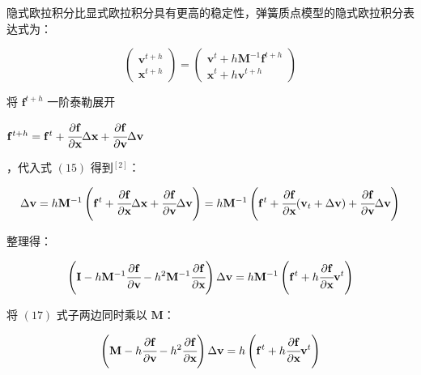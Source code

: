 \documentclass[UTF8]{ctexart}
\begin{document}
隐式欧拉积分比显式欧拉积分具有更高的稳定性，弹簧质点模型的隐式欧拉积分表达式为：

\begin{large}
\begin{equation}
\begin{pmatrix}
\mathbf{v}^{t+h} \\
\mathbf{x}^{t+h}
\end{pmatrix}
=
\begin{pmatrix}
\mathbf{v}^{t} + h \mathbf{M}^{-1} \mathbf{f}^{t+h} \\
\mathbf{x}^{t} + h \mathbf{v} ^ {t+h}
\end{pmatrix}
\end{equation}
\end{large}

将 $ \mathbf{f}^{t+h}$ 一阶泰勒展开 \begin{large} $ \mathbf{f}^{t+h} =  \mathbf{f}^{t} + \cfrac{\partial \mathbf{f}}{\partial \mathbf{x}} \Delta \mathbf{x} + \cfrac{\partial \mathbf{f}}{\partial \mathbf{v}} \Delta \mathbf{v}$\end{large}，代入式 $(15)$ 得到${}^{[2]}$：

\begin{large}
\begin{equation}
\Delta \mathbf{v} = h \mathbf{M}^{-1} \left ( \mathbf{f}^{t} + \cfrac{\partial \mathbf{f}}{\partial \mathbf{x}} \Delta \mathbf{x} + \cfrac{\partial \mathbf{f}}{\partial \mathbf{v}} \Delta \mathbf{v}  \right ) = 
h \mathbf{M}^{-1} \left ( \mathbf{f}^{t} + \cfrac{\partial \mathbf{f}}{\partial \mathbf{x}} (\mathbf{v}_t + \Delta \mathbf{v}) + \cfrac{\partial \mathbf{f}}{\partial \mathbf{v}} \Delta \mathbf{v}  \right )
\end{equation}
\end{large}

整理得：

\begin{large}
\begin{equation}
\left ( \mathbf{I} - h \mathbf{M}^{-1} \cfrac{\partial \mathbf{f}}{\partial \mathbf{v}} - h^2 \mathbf{M}^{-1} \cfrac{\partial \mathbf{f}}{\partial \mathbf{x}} \right ) \Delta \mathbf{v} =
h  \mathbf{M}^{-1} \left ( \mathbf{f}^{t} + h \cfrac{\partial \mathbf{f}}{\partial \mathbf{x}} \mathbf{v}^t \right )
\end{equation}
\end{large}

将 $(17)$ 式子两边同时乘以 $\mathbf{M}$：

\begin{large}
\begin{equation}
\left ( \mathbf{M} - h \cfrac{\partial \mathbf{f}}{\partial \mathbf{v}} - h^2 \cfrac{\partial \mathbf{f}}{\partial \mathbf{x}} \right ) \Delta \mathbf{v} =
h \left ( \mathbf{f}^{t} + h \cfrac{\partial \mathbf{f}}{\partial \mathbf{x}} \mathbf{v}^t \right )
\end{equation}
\end{large}
\end{document}
